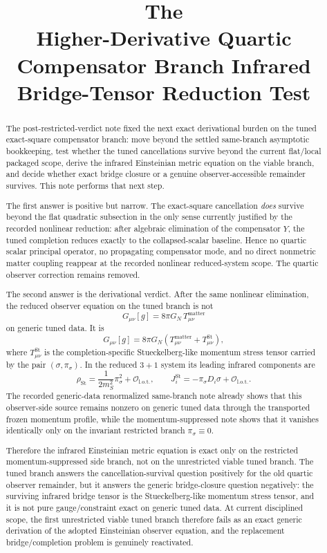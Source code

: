 \documentclass[11pt]{article}
\title{\textbf{The \TheoryName{}}\\[0.4em]
\large Higher-Derivative Quartic Compensator Branch Infrared Bridge-Tensor Reduction Test}
\author{}
\date{}
\begin{document}
\maketitle

\begin{abstract}
The post-restricted-verdict note fixed the next exact derivational burden on the tuned exact-square compensator branch: move beyond the settled same-branch asymptotic bookkeeping, test whether the tuned cancellations survive beyond the current flat/local packaged scope, derive the infrared Einsteinian metric equation on the viable branch, and decide whether exact bridge closure or a genuine observer-accessible remainder survives. This note performs that next step.

The first answer is positive but narrow. The exact-square cancellation \emph{does} survive beyond the flat quadratic subsection in the only sense currently justified by the recorded nonlinear reduction: after algebraic elimination of the compensator \(Y\), the tuned completion reduces exactly to the collapsed-scalar baseline. Hence no quartic scalar principal operator, no propagating compensator mode, and no direct nonmetric matter coupling reappear at the recorded nonlinear reduced-system scope. The quartic observer correction remains removed.

The second answer is the derivational verdict. After the same nonlinear elimination, the reduced observer equation on the tuned branch is not
\[
G_{\mu\nu}[g]=8\pi G_N\,T_{\mu\nu}^{\mathrm{matter}}
\]
on generic tuned data. It is
\[
G_{\mu\nu}[g]
=
8\pi G_N\left(
T_{\mu\nu}^{\mathrm{matter}}
+T_{\mu\nu}^{\mathrm{St}}
\right),
\]
where \(T_{\mu\nu}^{\mathrm{St}}\) is the completion-specific Stueckelberg-like momentum stress tensor carried by the pair \((\sigma,\pi_\sigma)\). In the reduced \(3+1\) system its leading infrared components are
\[
\rho_{\mathrm{St}}
=
\frac{1}{2m_S^2}\pi_\sigma^2+\mathcal O_{\mathrm{l.o.t.}},
\qquad
J_i^{\mathrm{St}}
=
-\pi_\sigma D_i\sigma+\mathcal O_{\mathrm{l.o.t.}}.
\]
The recorded generic-data renormalized same-branch note already shows that this observer-side source remains nonzero on generic tuned data through the transported frozen momentum profile, while the momentum-suppressed note shows that it vanishes identically only on the invariant restricted branch \(\pi_\sigma\equiv 0\).

Therefore the infrared Einsteinian metric equation is exact only on the restricted momentum-suppressed side branch, not on the unrestricted viable tuned branch. The tuned branch answers the cancellation-survival question positively for the old quartic observer remainder, but it answers the generic bridge-closure question negatively: the surviving infrared bridge tensor is the Stueckelberg-like momentum stress tensor, and it is not pure gauge/constraint exact on generic tuned data. At current disciplined scope, the first unrestricted viable tuned branch therefore fails as an exact generic derivation of the adopted Einsteinian observer equation, and the replacement bridge/completion problem is genuinely reactivated.
\end{abstract}
\end{document}
